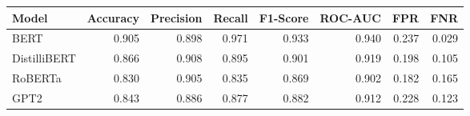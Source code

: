 \begin{tabular}{|l||r|r|r|r|r|r|r|}
\toprule
Model & \textbf{Accuracy} & \textbf{Precision} & Recall & \textbf{F1-Score} & \textbf{ROC-AUC} & \textbf{FPR} & FNR \\
\midrule \midrule
BERT & 0.905 & 0.898 & 0.971 & 0.933 & 0.940 & 0.237 & 0.029 \\
DistilliBERT & 0.866 & 0.908 & 0.895 & 0.901 & 0.919 & 0.198 & 0.105 \\
RoBERTa & 0.830 & 0.905 & 0.835 & 0.869 & 0.902 & 0.182 & 0.165 \\
GPT2 & 0.843 & 0.886 & 0.877 & 0.882 & 0.912 & 0.228 & 0.123 \\
\bottomrule
\end{tabular}

